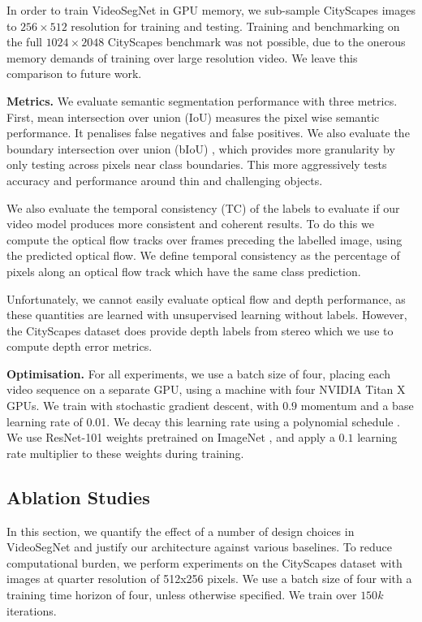 In order to train VideoSegNet in GPU memory, we sub-sample CityScapes images to $256\times 512$ resolution for training and testing. Training and benchmarking on the full $1024\times2048$ CityScapes benchmark was not possible, due to the onerous memory demands of training over large resolution video. We leave this comparison to future work.

\textbf{Metrics.} We evaluate semantic segmentation performance with three metrics. First, mean intersection over union (IoU) measures the pixel wise semantic performance. It penalises false negatives and false positives. We also evaluate the boundary intersection over union (bIoU) \citep{badrinarayanan2017segnet}, which provides more granularity by only testing across pixels near class boundaries. This more aggressively tests accuracy and performance around thin and challenging objects.

We also evaluate the temporal consistency (TC) of the labels to evaluate if our video model produces more consistent and coherent results. To do this we compute the optical flow tracks over frames preceding the labelled image, using the predicted optical flow. We define temporal consistency as the percentage of pixels along an optical flow track which have the same class prediction.

Unfortunately, we cannot easily evaluate optical flow and depth performance, as these quantities are learned with unsupervised learning without labels. However, the CityScapes dataset does provide depth labels from stereo \citep{Cordts2016Cityscapes} which we use to compute depth error metrics.

\textbf{Optimisation.} For all experiments, we use a batch size of four, placing each video sequence on a separate GPU, using a machine with four NVIDIA Titan X GPUs. We train with stochastic gradient descent, with $0.9$ momentum and a base learning rate of 0.01. We decay this learning rate using a polynomial schedule \citep{chen14semantic}. We use ResNet-101 weights pretrained on ImageNet \citep{he2016deep}, and apply a $0.1$ learning rate multiplier to these weights during training.

\subsection{Ablation Studies}
In this section, we quantify the effect of a number of design choices in VideoSegNet and justify our architecture against various baselines. To reduce computational burden, we perform experiments on the CityScapes dataset with images at quarter resolution of 512x256 pixels. We use a batch size of four with a training time horizon of four, unless otherwise specified. We train over $150k$ iterations.

